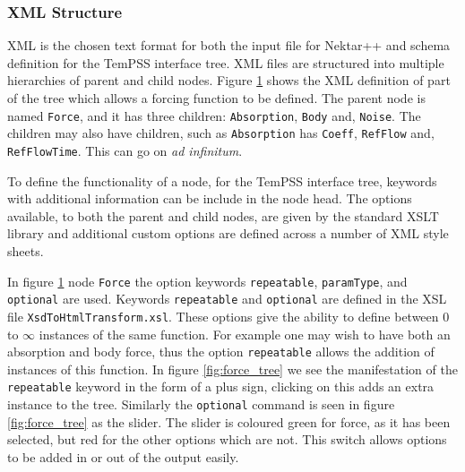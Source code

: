 \documentclass[11pt, a4paper]{report}
\begin{document}
\subsubsection{XML Structure}
XML is the chosen text format for both the input file for Nektar++ and schema definition for the TemPSS interface tree. XML files are structured into multiple	 hierarchies of parent and child nodes. Figure \ref{fig:XML} shows the XML definition of part of the tree which allows a forcing function to be defined. The parent node is named \texttt{Force}, and it has three children: \texttt{Absorption}, \texttt{Body} and, \texttt{Noise}. The children may also have children, such as \texttt{Absorption} has \texttt{Coeff}, \texttt{RefFlow} and, \texttt{RefFlowTime}. This can go on \textit{ad infinitum}.

\begin{figure}[htb!]
 \centering
 
 \label{fig:XML}
\end{figure}

To define the functionality of a node, for the TemPSS interface tree, keywords with additional information can be include in the node head. The options available, to both the parent and child nodes, are given by the standard XSLT library and additional custom options are defined across a number of XML style sheets. 

In figure \ref{fig:XML} node \texttt{Force} the option keywords \texttt{repeatable}, \texttt{paramType}, and \texttt{optional} are used. Keywords \texttt{repeatable} and \texttt{optional} are defined in the XSL file \texttt{XsdToHtmlTransform.xsl}. These options give the ability to define between $0$ to $\infty$ instances of the same function. For example one may wish to have both an absorption and body force, thus the option \texttt{repeatable} allows the addition of instances of this function. In figure \ref{fig:force_tree} we see the manifestation of the \texttt{repeatable} keyword in the form of a plus sign, clicking on this adds an extra instance to the tree. Similarly the \texttt{optional} command is seen in figure \ref{fig:force_tree} as the slider. The slider is coloured green for force, as it has been selected, but red for the other options which are not. This switch allows options to be added in or out of the output easily.
\end{document}
